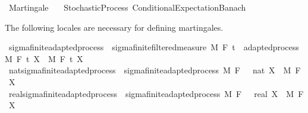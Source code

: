 %
\begin{isabellebody}%
%
%
\isadelimtheory
\isanewline
\isanewline
%
\endisadelimtheory
%
\isatagtheory
{}\isamarkupfalse%
\ Martingale\isanewline
\ \ \ Stochastic{\isacharunderscore}{\kern0pt}Process\ Conditional{\isacharunderscore}{\kern0pt}Expectation{\isacharunderscore}{\kern0pt}Banach\isanewline
{}%
\endisatagtheory
{\isafoldtheory}%
%
\isadelimtheory
%
\endisadelimtheory
%
\isadelimdocument
%
\endisadelimdocument
%
\isatagdocument
%
\isamarkuptrue%
%
\endisatagdocument
{\isafolddocument}%
%
\isadelimdocument
%
\endisadelimdocument
%
\begin{isamarkuptext}%
The following locales are necessary for defining martingales.%
\end{isamarkuptext}\isamarkuptrue%
%
\isadelimdocument
%
\endisadelimdocument
%
\isatagdocument
%
\isamarkuptrue%
%
\endisatagdocument
{\isafolddocument}%
%
\isadelimdocument
%
\endisadelimdocument
{}\isamarkupfalse%
\ sigma{\isacharunderscore}{\kern0pt}finite{\isacharunderscore}{\kern0pt}adapted{\isacharunderscore}{\kern0pt}process\ {\isacharequal}{\kern0pt}\ sigma{\isacharunderscore}{\kern0pt}finite{\isacharunderscore}{\kern0pt}filtered{\isacharunderscore}{\kern0pt}measure\ M\ F\ t\ {\isacharplus}{\kern0pt}\ adapted{\isacharunderscore}{\kern0pt}process\ M\ F\ t\ X\ \ M\ F\ t\ X\isanewline
\isanewline
{}\isamarkupfalse%
\ nat{\isacharunderscore}{\kern0pt}sigma{\isacharunderscore}{\kern0pt}finite{\isacharunderscore}{\kern0pt}adapted{\isacharunderscore}{\kern0pt}process\ {\isacharequal}{\kern0pt}\ sigma{\isacharunderscore}{\kern0pt}finite{\isacharunderscore}{\kern0pt}adapted{\isacharunderscore}{\kern0pt}process\ M\ F\ {\isachardoublequoteopen}{}\ {\isacharcolon}{\kern0pt}{\isacharcolon}{\kern0pt}\ nat{\isachardoublequoteclose}\ X\ \ M\ F\ X\isanewline
{}\isamarkupfalse%
\ real{\isacharunderscore}{\kern0pt}sigma{\isacharunderscore}{\kern0pt}finite{\isacharunderscore}{\kern0pt}adapted{\isacharunderscore}{\kern0pt}process\ {\isacharequal}{\kern0pt}\ sigma{\isacharunderscore}{\kern0pt}finite{\isacharunderscore}{\kern0pt}adapted{\isacharunderscore}{\kern0pt}process\ M\ F\ {\isachardoublequoteopen}{}\ {\isacharcolon}{\kern0pt}{\isacharcolon}{\kern0pt}\ real{\isachardoublequoteclose}\ X\ \ M\ F\ X\isanewline

\end{isabellebody}
